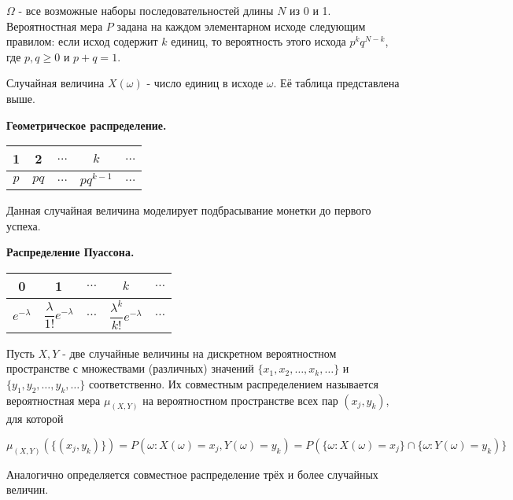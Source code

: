 \documentclass[a4paper]{article}
\begin{document}
\begin{colloq}
\begin{example}
   	$\Omega$ - все возможные наборы последовательностей длины $N$ из 0 и 1. Вероятностная мера $P$ задана на каждом элементарном исходе следующим правилом: если исход содержит $k$ единиц, то вероятность этого исхода $p^k	q^{N-k}$, где $p, q \geqslant 0$ и $p + q = 1$.
   	
   	Случайная величина $X(\omega)$ - число единиц в исходе $\omega$. Её таблица представлена выше.
   \end{example}

	\begin{example}
		
		\textbf{Геометрическое распределение.}
		
		\begin{tabular}{ | c | c | c | c | c |}
			\hline
			1 & 2 & $\dots$ & $k$ & $\dots$ \\ \hline
			$p$ & $pq$ & $\dots$ & $p q^{k-1}$ & $\dots$ \\
			\hline
		\end{tabular}
		
		Данная случайная величина моделирует подбрасывание монетки до первого успеха.
	\end{example}

	\begin{example}
		
		\textbf{Распределение Пуассона.}
		
		\begin{tabular}{ | c | c | c | c | c |}
			\hline
			0 & 1 & $\dots$ & $k$ & $\dots$ \\ \hline
			$e^{-\lambda}$ & $\dfrac{\lambda}{1!} e^{-\lambda}$ & $\dots$ & $\dfrac{\lambda^k}{k!} e^{-\lambda}$ & $\dots$ \\
			\hline
		\end{tabular}
	
	\end{example}

	\begin{definition*}
	Пусть $X, Y$ - две случайные величины на дискретном вероятностном пространстве с множествами (различных) значений $\{x_1, x_2, \dots, x_k, \dots\}$ и $\{y_1, y_2, \dots, y_k, \dots\}$ соответственно. Их совместным распределением называется вероятностная мера $\mu_{(X,Y)}$ на вероятностном пространстве всех пар $(x_j, y_k)$, для которой 
	
	$\mu_{(X,Y)}(\{(x_j, y_k)\}) = P(\omega: X(\omega) = x_j, Y(\omega) = y_k) = P(\{\omega: X(\omega) = x_j\} \cap \{\omega: Y(\omega) = y_k)\}$
	
	Аналогично определяется совместное распределение трёх и более случайных величин.
   	\end{definition*}
   

\end{colloq}
\end{document}
